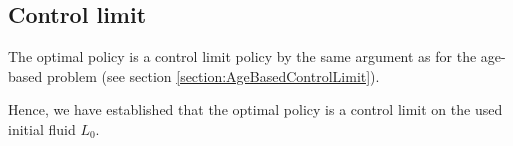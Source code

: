 \subsection{Control limit}
The optimal policy is a control limit policy by the same argument as for the age-based problem (see section \ref{section:AgeBasedControlLimit}). 
%

Hence, we have established that the optimal policy is a control limit on the used initial fluid $L_0$.